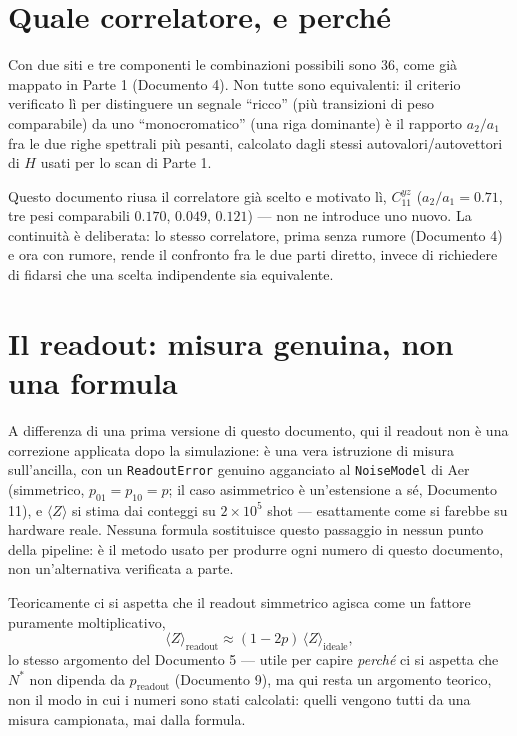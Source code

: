 \documentclass[11pt,a4paper]{article}
\begin{document}
\section{Quale correlatore, e perché}
\label{sec:scelta-correlatore}

Con due siti e tre componenti le combinazioni possibili sono $36$, come già
mappato in Parte 1 (Documento 4). Non tutte sono equivalenti: il criterio
verificato lì per distinguere un segnale ``ricco'' (più transizioni di peso
comparabile) da uno ``monocromatico'' (una riga dominante) è il rapporto
$a_2/a_1$ fra le due righe spettrali più pesanti, calcolato dagli stessi
autovalori/autovettori di $H$ usati per lo scan di Parte 1.

Questo documento riusa il correlatore già scelto e motivato lì,
$C_{11}^{yz}$ ($a_2/a_1=0.71$, tre pesi comparabili $0.170$, $0.049$,
$0.121$) --- non ne introduce uno nuovo. La continuità è deliberata: lo
stesso correlatore, prima senza rumore (Documento 4) e ora con rumore,
rende il confronto fra le due parti diretto, invece di richiedere di
fidarsi che una scelta indipendente sia equivalente.


\section{Il readout: misura genuina, non una formula}

A differenza di una prima versione di questo documento, qui il readout non è
una correzione applicata dopo la simulazione: è una vera istruzione di
misura sull'ancilla, con un \texttt{ReadoutError} genuino agganciato al
\texttt{NoiseModel} di Aer (simmetrico, $p_{01}=p_{10}=p$; il caso
asimmetrico è un'estensione a sé, Documento 11), e $\langle Z\rangle$ si
stima dai conteggi su $2\times10^5$ shot --- esattamente come si farebbe su
hardware reale. Nessuna formula sostituisce questo passaggio in nessun
punto della pipeline: è il metodo usato per produrre ogni numero di questo
documento, non un'alternativa verificata a parte.

Teoricamente ci si aspetta che il readout simmetrico agisca come un fattore
puramente moltiplicativo,
\begin{equation}
\langle Z\rangle_\text{readout} \approx (1-2p)\,\langle Z\rangle_\text{ideale},
\end{equation}
lo stesso argomento del Documento 5 --- utile per capire \emph{perché} ci si
aspetta che $N^*$ non dipenda da $p_\text{readout}$ (Documento 9), ma qui
resta un argomento teorico, non il modo in cui i numeri sono stati
calcolati: quelli vengono tutti da una misura campionata, mai dalla
formula.
\end{document}
